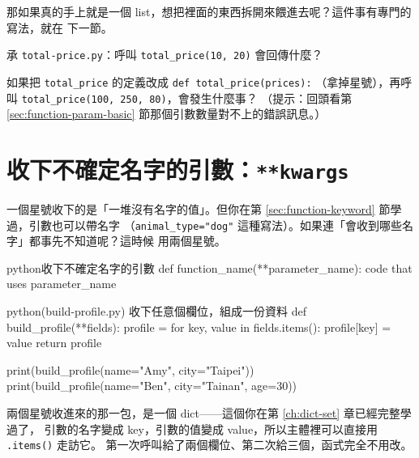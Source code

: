 那如果真的手上就是一個 list，想把裡面的東西拆開來餵進去呢？這件事有專門的寫法，就在
下一節。

\begin{drills}[label=drills:function-args]
\item 承 \texttt{total-price.py}：呼叫 \texttt{total\_price(10, 20)} 會回傳什麼？
\item 如果把 \texttt{total\_price} 的定義改成 \texttt{def total\_price(prices):}
（拿掉星號），再呼叫 \texttt{total\_price(100, 250, 80)}，會發生什麼事？
（提示：回頭看第 \ref{sec:function-param-basic} 節那個引數數量對不上的錯誤訊息。）
\end{drills}

\section{收下不確定名字的引數：\texttt{**kwargs}}
\label{sec:function-kwargs}

一個星號收下的是「一堆沒有名字的值」。但你在第 \ref{sec:function-keyword} 節學過，引數也可以帶名字
（\texttt{animal\_type="dog"} 這種寫法）。如果連「會收到哪些名字」都事先不知道呢？這時候
用兩個星號。

\begin{code}{python}{收下不確定名字的引數}
def function_name(**parameter_name):
    code that uses parameter_name
\end{code}

\begin{example}{python}{(build-profile.py) 收下任意個欄位，組成一份資料}
def build_profile(**fields):
    profile = {}
    for key, value in fields.items():
        profile[key] = value
    return profile


print(build_profile(name="Amy", city="Taipei"))
print(build_profile(name="Ben", city="Tainan", age=30))
\end{example}


兩個星號收進來的那一包，是一個 dict——這個你在第 \ref{ch:dict-set} 章已經完整學過了，
引數的名字變成 key，引數的值變成 value，所以主體裡可以直接用 \texttt{.items()} 走訪它。
第一次呼叫給了兩個欄位、第二次給三個，函式完全不用改。


